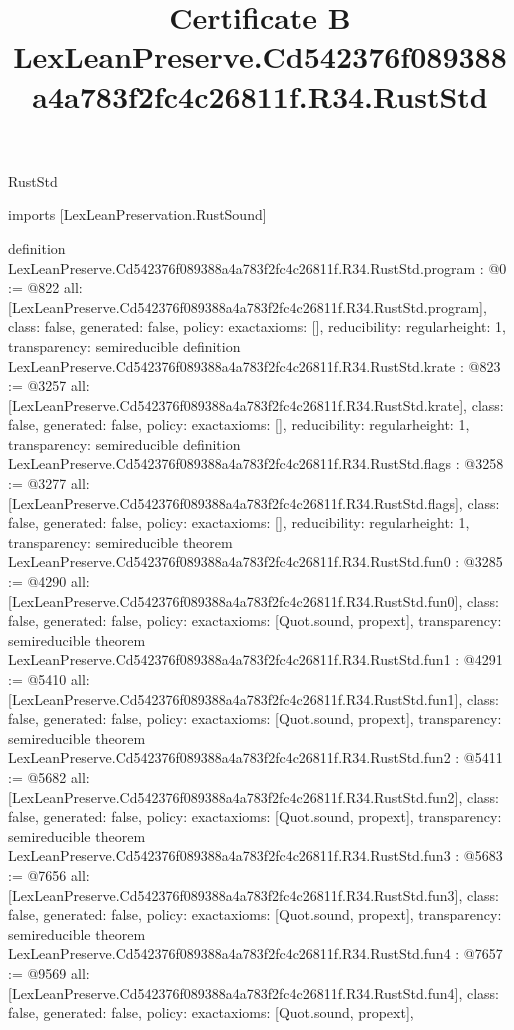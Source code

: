 \begin{lexlean}{RustStd}
\title{Certificate B LexLeanPreserve.Cd542376f089388a4a783f2fc4c26811f.R34.RustStd}
\begin{coremodule}
imports [LexLeanPreservation.RustSound]

definition LexLeanPreserve.Cd542376f089388a4a783f2fc4c26811f.R34.RustStd.program : @0 := @822 {
  all: [LexLeanPreserve.Cd542376f089388a4a783f2fc4c26811f.R34.RustStd.program],
  class: false,
  generated: false,
  policy: exact{axioms: []},
  reducibility: regular{height: 1},
  transparency: semireducible
}
definition LexLeanPreserve.Cd542376f089388a4a783f2fc4c26811f.R34.RustStd.krate : @823 := @3257 {
  all: [LexLeanPreserve.Cd542376f089388a4a783f2fc4c26811f.R34.RustStd.krate],
  class: false,
  generated: false,
  policy: exact{axioms: []},
  reducibility: regular{height: 1},
  transparency: semireducible
}
definition LexLeanPreserve.Cd542376f089388a4a783f2fc4c26811f.R34.RustStd.flags : @3258 := @3277 {
  all: [LexLeanPreserve.Cd542376f089388a4a783f2fc4c26811f.R34.RustStd.flags],
  class: false,
  generated: false,
  policy: exact{axioms: []},
  reducibility: regular{height: 1},
  transparency: semireducible
}
theorem LexLeanPreserve.Cd542376f089388a4a783f2fc4c26811f.R34.RustStd.fun0 : @3285 := @4290 {
  all: [LexLeanPreserve.Cd542376f089388a4a783f2fc4c26811f.R34.RustStd.fun0],
  class: false,
  generated: false,
  policy: exact{axioms: [Quot.sound, propext]},
  transparency: semireducible
}
theorem LexLeanPreserve.Cd542376f089388a4a783f2fc4c26811f.R34.RustStd.fun1 : @4291 := @5410 {
  all: [LexLeanPreserve.Cd542376f089388a4a783f2fc4c26811f.R34.RustStd.fun1],
  class: false,
  generated: false,
  policy: exact{axioms: [Quot.sound, propext]},
  transparency: semireducible
}
theorem LexLeanPreserve.Cd542376f089388a4a783f2fc4c26811f.R34.RustStd.fun2 : @5411 := @5682 {
  all: [LexLeanPreserve.Cd542376f089388a4a783f2fc4c26811f.R34.RustStd.fun2],
  class: false,
  generated: false,
  policy: exact{axioms: [Quot.sound, propext]},
  transparency: semireducible
}
theorem LexLeanPreserve.Cd542376f089388a4a783f2fc4c26811f.R34.RustStd.fun3 : @5683 := @7656 {
  all: [LexLeanPreserve.Cd542376f089388a4a783f2fc4c26811f.R34.RustStd.fun3],
  class: false,
  generated: false,
  policy: exact{axioms: [Quot.sound, propext]},
  transparency: semireducible
}
theorem LexLeanPreserve.Cd542376f089388a4a783f2fc4c26811f.R34.RustStd.fun4 : @7657 := @9569 {
  all: [LexLeanPreserve.Cd542376f089388a4a783f2fc4c26811f.R34.RustStd.fun4],
  class: false,
  generated: false,
  policy: exact{axioms: [Quot.sound, propext]},
}
\end{coremodule}
\end{lexlean}
